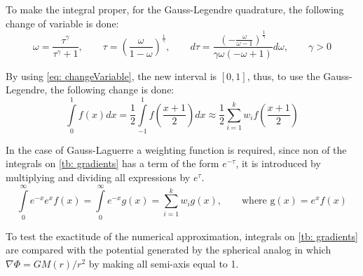 		To make the integral proper, for the Gauss-Legendre quadrature, the following change of variable is done:
		\begin{equation}\label{eq: changeVariable}
			\omega = \dfrac{\tau^\gamma}{\tau^\gamma + 1}, \qquad \tau = \left(\frac{\omega}{1-\omega}\right)^{\frac{1}{\gamma}}, \qquad d\tau = \dfrac{\left(- \frac{\omega}{\omega - 1}\right)^{\frac{1}{\gamma}}}{\gamma \omega \left(- \omega + 1\right)} d\omega, \qquad \gamma > 0
		\end{equation} 
		
		By using \autoref{eq: changeVariable}, the new interval is $[0, 1]$, thus, to use the Gauss-Legendre, the following change is done:
		\begin{equation}
			\int\limits_{0}^{1}f(x)dx = \dfrac{1}{2}\int\limits_{-1}^{1}f\left(\dfrac{x + 1}{2}\right)dx \approx \dfrac{1}{2}\sum_{i = 1}^{k}w_if\left(\dfrac{x + 1}{2}\right)
		\end{equation}
		
		In the case of Gauss-Laguerre a weighting function is required, since non of the integrals on \autoref{tb: gradients} has a term of the form $e^{-\tau}$, it is introduced by multiplying and dividing all expressions by $e^{\tau}$.
		\begin{equation}
			\int\limits_{0}^{\infty}e^{-x}e^{x}f(x) = \int\limits_{0}^{\infty}e^{-x}g(x) = \sum_{i = 1}^{k}w_i g(x), \qquad \text{where g$(x) = e^xf(x)$}
		\end{equation}
		
		To test the exactitude of the numerical approximation, integrals on \autoref{tb: gradients} are compared with the potential generated by the spherical analog in which $\nabla\Phi = GM(r)/r^2$ by making all semi-axis equal to 1.
		
